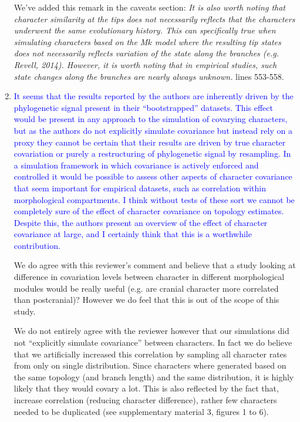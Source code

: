 \documentclass[12pt,letterpaper]{article}
\begin{document}
\begin{enumerate}
We've added this remark in the caveats section:
\textit{It is also worth noting that character similarity at the tips does not necessarily reflects that the characters underwent the same evolutionary history.
This can specifically true when simulating characters based on the M$k$ model where the resulting tip states does not necessarily reflects variation of the state along the branches (e.g. Revell, 2014). However, it is worth noting that in empirical studies, such state changes along the branches are nearly always unknown.} lines 553-558.

\item{\textcolor{blue}{It seems that the results reported by the authors are inherently driven by the phylogenetic signal present in their ``bootstrapped'' datasets. This effect would be present in any approach to the simulation of covarying characters, but as the authors do not explicitly simulate covariance but instead rely on a proxy they cannot be certain that their results are driven by true character covariation or purely a restructuring of phylogenetic signal by resampling. In a simulation framework in which covariance is actively enforced and controlled it would be possible to assess other aspects of character covariance that seem important for empirical datasets, such as correlation within morphological compartments. I think without tests of these sort we cannot be completely sure of the effect of character covariance on topology estimates. Despite this, the authors present an overview of the effect of character covariance at large, and I certainly think that this is a worthwhile contribution.}}

We do agree with this reviewer's comment and believe that a study looking at difference in covariation levels between character in different morphological modules would be really useful (e.g. are cranial character more correlated than postcranial)?
However we do feel that this is out of the scope of this study.

We do not entirely agree with the reviewer however that our simulations did not ``explicitly simulate covariance'' between characters.
In fact we do believe that we artificially increased this correlation by sampling all character rates from only on single distribution.
Since characters where generated based on the same topology (and branch length) and the same distribution, it is highly likely that they would covary a lot.
This is also reflected by the fact that, increase correlation (reducing character difference), rather few characters needed to be duplicated (see supplementary material 3, figures 1 to 6).


\end{enumerate}
\end{document}
